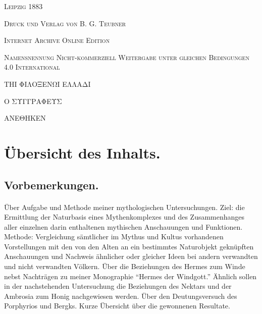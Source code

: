 \documentclass[a4paper, 11pt, oneside]{article}
\begin{document}
\begin{titlepage}
        \vspace*{\fill}

	\vspace{1\baselineskip}

	{\small\scshape Leipzig 1883}
	
	{\small\scshape{Druck und Verlag von B. G. Teubner}}
 
	\vspace{0.5\baselineskip} %

        \scshape Internet Archive Online Edition  %
	
	{\scshape\small Namensnennung Nicht-kommerziell Weitergabe unter gleichen Bedingungen 4.0 International} %
\end{titlepage}
\setlength{\parskip}{1mm plus1mm minus1mm}
\clearpage
\vspace*{\fill}
\begin{center}
\LARGE
ΤΗΙ ΦΙΛΟΞΕΝΩΙ ΕΛΛΑΔΙ

Ο ΣΥΓΓΡΑΦΕΥΣ

ΑΝΕΘΗΚΕΝ
\end{center}
\vspace*{\fill}
\clearpage
\tableofcontents
\clearpage
\section*{Übersicht des Inhalts.}
\subsection*{Vorbemerkungen.}
\paragraph{}
Über Aufgabe und Methode meiner mythologischen Untersuchungen. Ziel: die Ermittlung der Naturbasis eines Mythenkomplexes und des Zusammenhanges aller einzelnen darin enthaltenen mythischen Anschauungen und Funktionen. Methode: Vergleichung sämtlicher im Mythus und Kultus vorhandenen Vorstellungen mit den von den Alten an ein bestimmtes Naturobjekt geknüpften Anschauungen und Nachweis ähnlicher oder gleicher Ideen bei andern verwandten und nicht verwandten Völkern. Über die Beziehungen des Hermes zum Winde nebst Nachträgen zu meiner Monographie "`Hermes der Windgott."' Ähnlich sollen in der nachstehenden Untersuchung die Beziehungen des Nektars und der Ambrosia zum Honig nachgewiesen werden. Über den Deutungsversuch des Porphyrios und Bergks. Kurze Übersicht über die gewonnenen Resultate.
\end{document}
